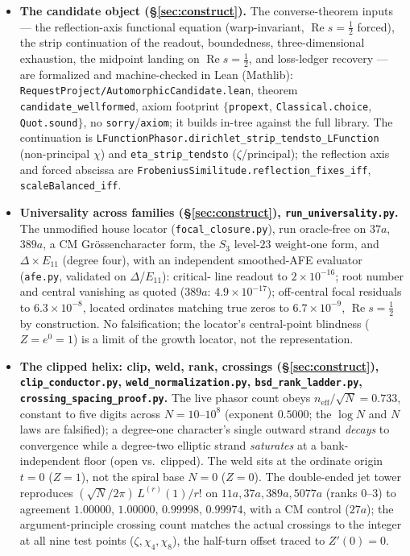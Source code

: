 \documentclass[11pt]{article}
\theoremstyle{definition}
\renewcommand{\Re}{\operatorname{Re}}
\begin{document}
\begin{itemize}
\item \textbf{The candidate object (\S\ref{sec:construct}).} The converse-theorem inputs --- the
reflection-axis functional equation (warp-invariant, $\Re s=\tfrac12$ forced), the strip continuation
of the readout, boundedness, three-dimensional exhaustion, the midpoint landing on $\Re s=\tfrac12$,
and loss-ledger recovery --- are formalized and machine-checked in Lean (Mathlib):
\texttt{RequestProject/AutomorphicCandidate.lean}, theorem \texttt{candidate\_wellformed}, axiom
footprint $\{$\texttt{propext}, \texttt{Classical.choice}, \texttt{Quot.sound}$\}$, no
\texttt{sorry}/\texttt{axiom}; it builds in-tree against the full library. The continuation is
\texttt{LFunctionPhasor.dirichlet\_strip\_tendsto\_LFunction} (non-principal $\chi$) and
\texttt{eta\_strip\_tendsto} ($\zeta$/principal); the reflection axis and forced abscissa are
\texttt{FrobeniusSimilitude.reflection\_fixes\_iff}, \texttt{scaleBalanced\_iff}.

\item \textbf{Universality across families (\S\ref{sec:construct}), \texttt{run\_universality.py}.}
The unmodified house locator (\texttt{focal\_closure.py}), run oracle-free on $37a$, $389a$, a CM
Gr\"ossencharacter form, the $S_3$ level-$23$ weight-one form, and $\Delta\times E_{11}$ (degree four),
with an independent smoothed-AFE evaluator (\texttt{afe.py}, validated on $\Delta$/$E_{11}$): critical-
line readout to $2\times10^{-16}$; root number and central vanishing as quoted
($389a$: $4.9\times10^{-17}$); off-central focal residuals to $6.3\times10^{-8}$, located ordinates
matching true zeros to $6.7\times10^{-9}$, $\Re s=\tfrac12$ by construction. No falsification; the
locator's central-point blindness ($Z=e^{0}=1$) is a limit of the growth locator, not the
representation.

\item \textbf{The clipped helix: clip, weld, rank, crossings (\S\ref{sec:construct}),
\texttt{clip\_conductor.py}, \texttt{weld\_normalization.py}, \texttt{bsd\_rank\_ladder.py},
\texttt{crossing\_spacing\_proof.py}.} The live phasor count obeys $n_{\mathrm{eff}}/\sqrt N=0.733$,
constant to five digits across $N=10$–$10^8$ (exponent $0.5000$; the $\log N$ and $N$ laws are
falsified); a degree-one character's single outward strand \emph{decays} to convergence while a
degree-two elliptic strand \emph{saturates} at a bank-independent floor (open vs.\ clipped). The weld
sits at the ordinate origin $t=0$ ($Z=1$), not the spiral base $N=0$ ($Z=0$). The double-ended jet
tower reproduces $(\sqrt N/2\pi)\,L^{(r)}(1)/r!$ on $11a,37a,389a,5077a$ (ranks $0$–$3$) to agreement
$1.00000,\,1.00000,\,0.99998,\,0.99974$, with a CM control ($27a$); the argument-principle crossing
count matches the actual crossings to the integer at all nine test points ($\zeta,\chi_4,\chi_8$), the
half-turn offset traced to $Z'(0)=0$.


\end{itemize}
\end{document}
